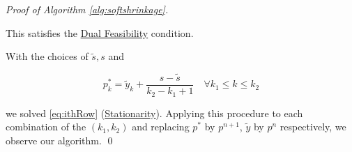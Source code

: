 \begin{proof}[Proof of Algorithm \ref{alg:softshrinkage}]
\begin{enumerate}
            This satisfies the \underline{Dual Feasibility} condition.



        \end{enumerate}

        With the choices of $\tilde{s}, s$ and

            $$p^{\ast}_{k} = \tilde{y}_{k} + \frac{s - \tilde{s}}{k_{2} - k_{1} + 1} \,\,\,\,\,\, \forall k_{1} \le k \le k_{2}$$

        we solved \ref{eq:ithRow} (\underline{Stationarity}). Applying this procedure to each combination of the $(k_{1}, k_{2})$ and replacing $p^{\ast}$ by $p^{n+1}$, $\tilde{y}$ by $p^{n}$ respectively, we observe our algorithm.
        \qed
    \end{proof}



